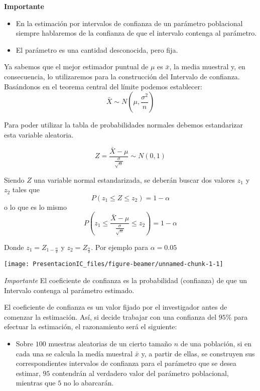 \documentclass[
  10pt,
  ignorenonframetext,
]{beamer}
\providecommand{\tightlist}{%
  \setlength{\itemsep}{0pt}\setlength{\parskip}{0pt}}
\begin{document}
\begin{frame}{}
\protect\hypertarget{section}{}
\textbf{Importante}

\begin{itemize}
\tightlist
\item
  En la estimación por intervalos de confianza de un parámetro
  poblacional siempre hablaremos de la confianza de que el intervalo
  contenga al parámetro.
\item
  El parámetro es una cantidad desconocida, pero fija.
\end{itemize}

Ya sabemos que el mejor estimador puntual de \(\mu\) es \(\bar{x}\), la
media muestral y, en consecuencia, lo utilizaremos para la construcción
del Intervalo de confianza. Basándonos en el teorema central del límite
podemos establecer:
\[\bar{X}\sim N \left( \mu,\frac{\sigma^2}{n}\right)\]
\end{frame}

\begin{frame}{}
\protect\hypertarget{section-1}{}
Para poder utilizar la tabla de probabilidades normales debemos
estandarizar esta variable aleatoria.

\[Z = \frac{\bar{X}-\mu}{\frac{\sigma}{\sqrt{n}}} \sim N(0,1)\]

Siendo \(Z\) una variable normal estandarizada, se deberán buscar dos
valores \(z_1\) y \(z_2\) tales que \[ P(z_1 \le Z \le z_2)=1-\alpha \]
o lo que es lo mismo
\[ P\left(z_1 \le \frac{\bar{X}-\mu}{\frac{\sigma}{\sqrt{n}}} \le z_2\right)=1-\alpha \]
\end{frame}

\begin{frame}{}
\protect\hypertarget{section-2}{}
Donde \(z_1 = Z_{1-\frac{\alpha}{2}}\) y \(z_2 = Z_{\frac{\alpha}{2}}\).
Por ejemplo para \(\alpha = 0.05\)

\begin{center}\texttt{[image: PresentacionIC\_files/figure-beamer/unnamed-chunk-1-1]} \end{center}

\emph{Importante} El coeficiente de confianza es la probabilidad
(confianza) de que un Intervalo contenga al parámetro estimado.
\end{frame}

\begin{frame}{}
\protect\hypertarget{section-3}{}
El coeficiente de confianza es un valor fijado por el investigador antes
de comenzar la estimación. Así, si decide trabajar con una confianza del
\(95\%\) para efectuar la estimación, el razonamiento será el siguiente:

\begin{itemize}
\tightlist
\item
  Sobre \(100\) muestras aleatorias de un cierto tamaño \(n\) de una
  población, si en cada una se calcula la medía muestral \(\bar{x}\) y,
  a partir de ellas, se construyen sus correspondientes intervalos de
  confianza para el parámetro que se desea estimar, \(95\) contendrán al
  verdadero valor del parámetro poblacional, mientras que \(5\) no lo
  abarcarán.
\end{itemize}
\end{frame}
\end{document}
